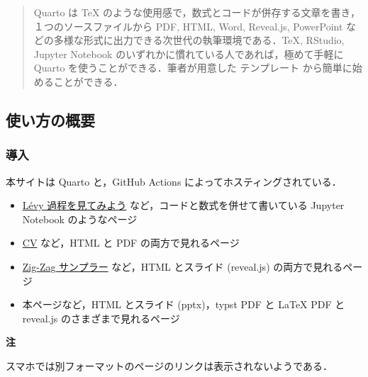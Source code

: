 \documentclass[
]{ltjsarticle}
\author{司馬博文}
\date{11/04/2023}
\providecommand{\tightlist}{%
  \setlength{\itemsep}{0pt}\setlength{\parskip}{0pt}}\usepackage{longtable,booktabs,array}
\begin{document}
\maketitle
\begin{abstract}
Quarto は TeX
のような使用感で，数式とコードが併存する文章を書き，１つのソースファイルから
PDF, HTML, Word, Reveal.js, PowerPoint
などの多様な形式に出力できる次世代の執筆環境である．TeX, RStudio,
Jupyter Notebook のいずれかに慣れている人であれば，極めて手軽に Quarto
を使うことができる．筆者が用意した テンプレート
から簡単に始めることができる．
\end{abstract}

\subsection{使い方の概要}\label{ux4f7fux3044ux65b9ux306eux6982ux8981}

\subsubsection{導入}\label{ux5c0eux5165}

本サイトは Quarto と，GitHub Actions によってホスティングされている．

\begin{tcolorbox}[enhanced jigsaw, bottomrule=.15mm, leftrule=.75mm, colframe=quarto-callout-important-color-frame, opacityback=0, toprule=.15mm, colback=white, arc=.35mm, breakable, rightrule=.15mm, left=2mm]

\begin{itemize}
\tightlist
\item
  \href{../../2024/Process/Levy.qmd}{Lévy 過程を見てみよう}
  など，コードと数式を併せて書いている Jupyter Notebook のようなページ
\item
  \href{../../../static/CV/cv.qmd}{CV} など，HTML と PDF
  の両方で見れるページ
\item
  \href{../../2024/Slides/ZigZagSampler.qmd}{Zig-Zag サンプラー}
  など，HTML とスライド (reveal.js) の両方で見れるページ
\item
  本ページなど，HTML とスライド (pptx)，typst PDF と LaTeX PDF と
  reveal.js のさまざまで見れるページ
\end{itemize}

\end{tcolorbox}

\begin{tcolorbox}[enhanced jigsaw, bottomrule=.15mm, leftrule=.75mm, colframe=quarto-callout-important-color-frame, opacityback=0, toprule=.15mm, colback=white, arc=.35mm, breakable, rightrule=.15mm, left=2mm]

\vspace{-3mm}\textbf{注}\vspace{3mm}

スマホでは別フォーマットのページのリンクは表示されないようである．

\end{tcolorbox}
\end{document}
